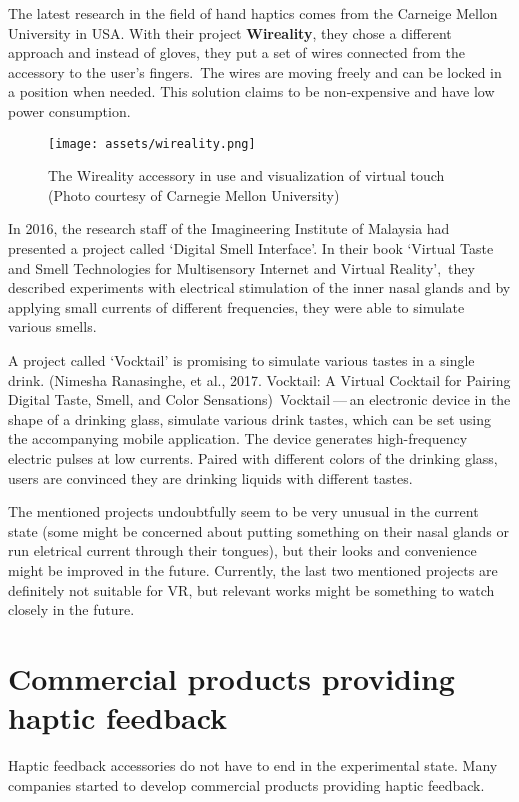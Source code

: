 The latest research in the field of hand haptics comes from the Carneige Mellon
University in USA. With their project \textbf{Wireality}, they chose a different
approach and instead of gloves, they put a set of wires connected from the
accessory to the user’s fingers.\,\cite{wireality} The wires are moving freely 
and can be locked in a position when needed. This solution claims to be 
non-expensive and have low power consumption. 


\begin{figure}[h]{}
\centering\texttt{[image: assets/wireality.png]}
\caption{The Wireality accessory in use and visualization of virtual touch (Photo courtesy of Carnegie Mellon University)}
\end{figure}

In 2016, the research staff of the Imagineering Institute of Malaysia
had presented a project called `Digital Smell Interface'. In their book
`Virtual Taste and Smell Technologies for Multisensory Internet and Virtual
Reality',\,\cite{vrstmivr} they described experiments with electrical stimulation
of the inner nasal glands and by applying small currents of different
frequencies, they were able to simulate various smells.


A project called `Vocktail' is promising to simulate various tastes in a single
drink.
(Nimesha Ranasinghe, et al., 2017. Vocktail: A Virtual Cocktail for Pairing
Digital Taste, Smell, and Color Sensations)\,\cite{vocktail} Vocktail — an electronic
device in the shape of a drinking glass, simulate various drink tastes,
which can be set using the accompanying mobile application. The device
generates high-frequency electric pulses at low currents. Paired with
different colors of the drinking glass, users are convinced they are drinking
liquids with different tastes.


The mentioned projects undoubtfully seem to be very unusual in the current state
(some might be concerned about putting something on their nasal glands or run
eletrical current through their tongues), but their looks and convenience
might be improved in the future. Currently, the last two mentioned projects 
are definitely not suitable for VR, but relevant works might be something to
watch closely in the future.


\hypertarget{x-commercial-products-providing-haptic-feedback}{\section{Commercial products providing haptic feedback}}
Haptic feedback accessories do not have to end in the experimental state.
Many companies started to develop commercial products providing haptic feedback.


